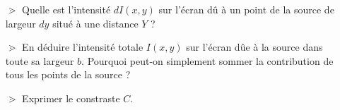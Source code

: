 \documentclass{report}
\begin{document}
\begin{itemize}

	\item[$\gtrdot$] Quelle est l'intensité $dI(x,y)$ sur l'écran dû à un point de la source de largeur $dy$ situé à une distance $Y$ ?
	
	\item[$\gtrdot$] En déduire l'intensité totale $I(x,y)$ sur l'écran dûe à la source dans toute sa largeur $b$. Pourquoi peut-on simplement sommer la contribution de tous les points de la source ?
	
	\item[$\gtrdot$] Exprimer le constraste $C$.

\end{itemize}
\end{document}
